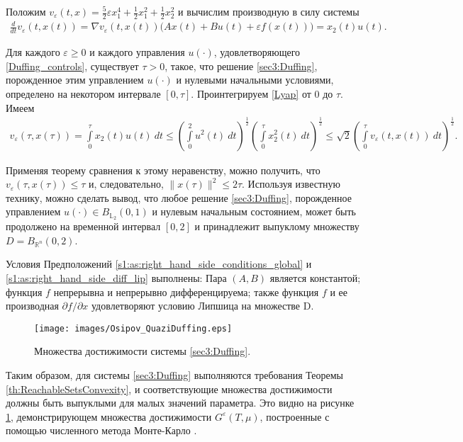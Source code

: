 \documentclass[../main.tex]{subfiles}
\begin{document}
 Положим $v_{\varepsilon}(t,x) = \frac{5}{2}\varepsilon x_1^4 + \frac{1}{2}x_1^2 + \frac{1}{2}x_2^2$ и вычислим производную в силу системы 
 \begin{gather}\label{Lyap}
 \frac{d}{dt} v_{\varepsilon}(t,x(t)) = \nabla v_{\varepsilon}(t,x(t)) \big(A x(t) + B u(t) + \varepsilon f(x(t))\big) = x_2(t) u(t). 
 \end{gather} 
 
 Для каждого $\varepsilon \geqslant 0$ и каждого управления $u(\cdot)$, удовлетворяющего \eqref{Duffing_controls}, существует $\tau>0$, такое, что решение \eqref{sec3:Duffing}, порожденное этим управлением $u(\cdot)$ и нулевыми начальными условиями, определено на некотором интервале $[0, \tau]$. 
 Проинтегрируем \eqref{Lyap} от $0$ до $\tau$. 
 Имеем 
 \begin{gather*}
 v_{\varepsilon}(\tau,x(\tau)) =
 \int\limits_0^{\tau} x_2(t) u(t) \ dt 
 \leqslant 
 \left(\int\limits_0^2 u^2(t) \ dt \right)^{\frac{1}{2}} \left(\int\limits_0^{\tau} x_2^2(t) \ dt \right)^{\frac{1}{2}} \leqslant \sqrt{2} \left(\int\limits_0^{\tau} v_{\varepsilon}(t,x(t)) \ dt \right)^{\frac{1}{2}}.
 \end{gather*}
 
 Применяя теорему сравнения к этому неравенству, можно получить, что $v_{\varepsilon}(\tau,x(\tau)) \leqslant \tau$ и, следовательно, $\|x(\tau)\|^2 \leqslant 2 \tau$. 
 Используя известную технику, можно сделать вывод, что любое решение \eqref{sec3:Duffing}, порожденное управлением $u(\cdot) \in B_{\mathbb{L}_2}(0,1)$ и нулевым начальным состоянием, может быть продолжено на временной интервал $[0,2]$ и принадлежит выпуклому множеству $D = B_{\mathbb{R}^n}(0,2)$.
 
 Условия Предположений \ref{s1:as:right_hand_side_conditions_global} и \ref{s1:as:right_hand_side_diff_lip} выполнены: Пара $(A,B)$ является константой; функция $f$ непрерывна и непрерывно дифференцируема; также функция $f$ и ее производная $\partial f/\partial x$ удовлетворяют условию Липшица на множестве D.
 
 \begin{figure}[t]
 \centerline{
 \texttt{[image: images/Osipov\_QuaziDuffing.eps]}}
 \caption{Множества достижимости системы \eqref{sec3:Duffing}.}
 \label{fig:Duffing}
 \end{figure}
 
 Таким образом, для системы \eqref{sec3:Duffing} выполняются требования Теоремы \ref{th:ReachableSetsConvexity}, и соответствующие множества достижимости должны быть выпуклыми для малых значений параметра. 
 Это видно на рисунке \ref{fig:Duffing}, демонстрирующем множества достижимости $G^{\varepsilon}(T,\mu)$, построенные с помощью численного метода Монте-Карло \cite{Patent,Zykov}.
 
\end{document}
